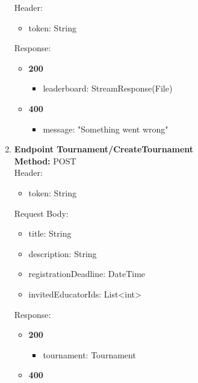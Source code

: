 \begin{enumerate}
    Header:\\
    \begin{itemize}
        \item token: String
    \end{itemize}
    Response:\\
    \begin{itemize}
        \item \textbf{200} \\
        \begin{itemize}
            \item leaderboard: StreamResponse(File)
        \end{itemize}
        \item \textbf{400} \\
        \begin{itemize}
            \item message: "Something went wrong"
        \end{itemize}
    \end{itemize}
    \item \textbf{Endpoint Tournament/CreateTournament} \\
    \textbf{Method:} POST \\
    Header:\\
    \begin{itemize}
        \item token: String
    \end{itemize}
    Request Body:\\
    \begin{itemize}
        \item title: String
        \item description: String
        \item registrationDeadline: DateTime
        \item invitedEducatorIds: List<int>
    \end{itemize}
    Response:\\
    \begin{itemize}
        \item \textbf{200} \\
        \begin{itemize}
            \item tournament: Tournament
        \end{itemize}
        \item \textbf{400} \\
        \begin{itemize}

\end{itemize}
\end{itemize}
\end{enumerate}
